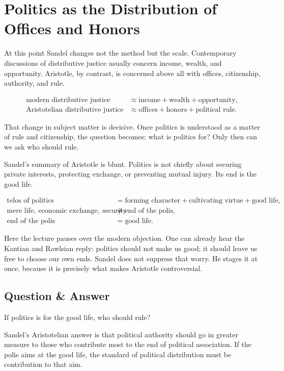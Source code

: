 \section{Politics as the Distribution of Offices and Honors}

At this point Sandel changes not the method but the scale. Contemporary discussions of distributive justice usually concern income, wealth, and opportunity. Aristotle, by contrast, is concerned above all with offices, citizenship, authority, and rule.

\begin{align}
\text{modern distributive justice}
&\approx
\text{income}+\text{wealth}+\text{opportunity},\\
\text{Aristotelian distributive justice}
&\approx
\text{offices}+\text{honors}+\text{political rule}.
\end{align}

That change in subject matter is decisive. Once politics is understood as a matter of rule and citizenship, the question becomes: what is politics for? Only then can we ask who should rule.

Sandel's summary of Aristotle is blunt. Politics is not chiefly about securing private interests, protecting exchange, or preventing mutual injury. Its end is the good life.

\begin{align}
\text{telos of politics}
&=
\text{forming character}
+\text{cultivating virtue}
+\text{good life},\\
\text{mere life},\ \text{economic exchange},\ \text{security}
&\neq
\text{end of the polis},\\
\text{end of the polis}
&=
\text{good life}.
\end{align}

Here the lecture pauses over the modern objection. One can already hear the Kantian and Rawlsian reply: politics should not make us good; it should leave us free to choose our own ends. Sandel does not suppress that worry. He stages it at once, because it is precisely what makes Aristotle controversial.

\subsection{Question \& Answer}

If politics is for the good life, who should rule?

Sandel's Aristotelian answer is that political authority should go in greater measure to those who contribute most to the end of political association. If the polis aims at the good life, the standard of political distribution must be contribution to that aim.

